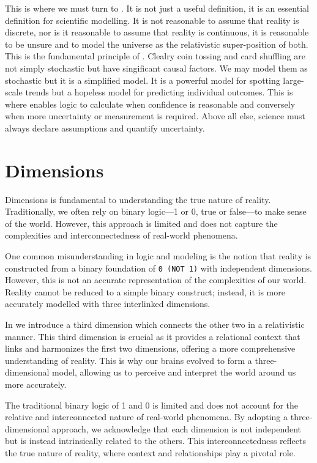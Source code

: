 \documentclass[12pt]{article}
\begin{document}
This is where we must turn to \qbit{}. It is not just a useful definition, it is an essential definition for scientific modelling. It is not reasonable to assume that reality is discrete, nor is it reasonable to assume that reality is continuous, it is reasonable to be unsure and to model the universe as the relativistic super-position of both. This is the fundamental principle of \iR{}. Clealry coin tossing and card shuffling are not simply stochastic but have singificant causal factors. We may model them as stochastic but it is a simplified model. It is a powerful model for spotting large-scale trends but a hopeless model for predicting individual outcomes. This is where \qbit{} enables logic to calculate when confidence is reasonable and conversely when more uncertainty or measurement is required. Above all else, science must always declare assumptions and quantify uncertainty.

\section*{\iR{} Dimensions}

\iR{} Dimensions is fundamental to understanding the true nature of reality. Traditionally, we often rely on binary logic—1 or 0, true or false—to make sense of the world. However, this approach is limited and does not capture the complexities and interconnectedness of real-world phenomena.

One common misunderstanding in logic and modeling is the notion that reality is constructed from a binary foundation of \texttt{0 (NOT 1)} with independent dimensions. However, this is not an accurate representation of the complexities of our world. Reality cannot be reduced to a simple binary construct; instead, it is more accurately modelled with three interlinked dimensions.

In \iR{} we introduce a third dimension which connects the other two in a relativistic manner. This third dimension is crucial as it provides a relational context that links and harmonizes the first two dimensions, offering a more comprehensive understanding of reality. This is why our brains evolved to form a three-dimensional model, allowing us to perceive and interpret the world around us more accurately.

The traditional binary logic of 1 and 0 is limited and does not account for the relative and interconnected nature of real-world phenomena. By adopting a three-dimensional approach, we acknowledge that each dimension is not independent but is instead intrinsically related to the others. This interconnectedness reflects the true nature of reality, where context and relationships play a pivotal role.
\end{document}
